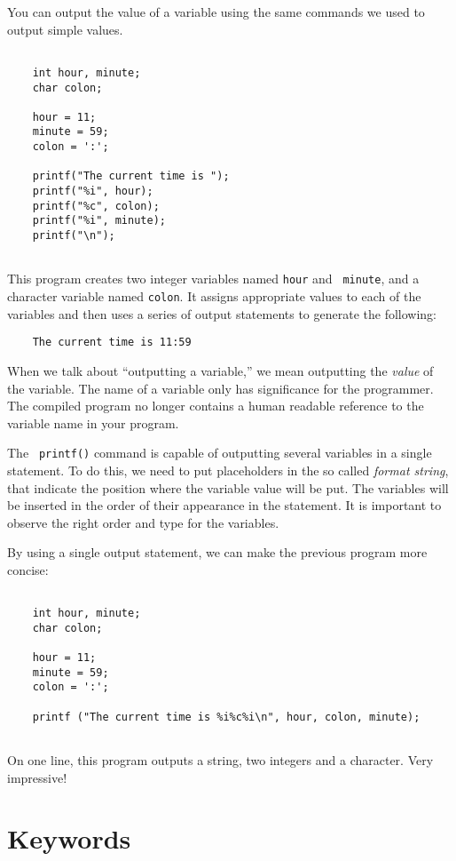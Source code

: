 You can output the value of a variable using the same commands
we used to output simple values.

\begin{verbatim}

    int hour, minute;
    char colon;

    hour = 11;
    minute = 59;
    colon = ':';

    printf("The current time is ");
    printf("%i", hour);
    printf("%c", colon);
    printf("%i", minute);
    printf("\n"); 
  
\end{verbatim}
%
This program creates two integer variables named {\tt hour} and {\tt
minute}, and a character variable named {\tt colon}.  It assigns
appropriate values to each of the variables and then uses a series
of output statements to generate the following:

\begin{verbatim}
    The current time is 11:59
\end{verbatim}

When we talk about ``outputting a variable,'' we mean outputting the
{\em value} of the variable.  The name of a variable only has significance for
the programmer. The compiled program no longer contains a human readable
reference to the variable name in your program. 

The \texttt{ printf()} command is capable of outputting several variables
in a single statement. To do this, we need to put placeholders
in the so called \emph{format string}, that indicate the position where the variable value will
be put. The variables will be inserted in the order of their appearance in 
the statement. It is important to observe the right order and type for the variables.

By using a single output statement, we can make the previous program more
concise:

\begin{verbatim}
    
    int hour, minute;
    char colon;

    hour = 11;
    minute = 59;
    colon = ':';

    printf ("The current time is %i%c%i\n", hour, colon, minute);
    
\end{verbatim}
%
On one line, this program outputs a string, two integers and a character.  Very impressive!

\section{Keywords}

